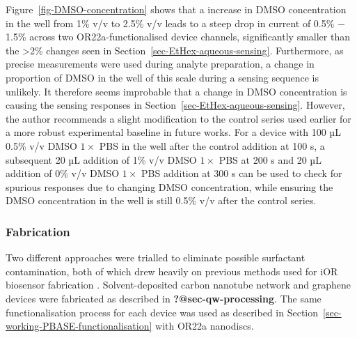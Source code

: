 \documentclass[
  a4paper,
]{scrbook}
\begin{document}
Figure~\ref{fig-DMSO-concentration} shows that a increase in DMSO
concentration in the well from 1\% v/v to 2.5\% v/v leads to a steep
drop in current of 0.5\% \(-\) 1.5\% across two OR22a-functionalised
device channels, significantly smaller than the \textgreater2\% changes
seen in Section~\ref{sec-EtHex-aqueous-sensing}. Furthermore, as precise
measurements were used during analyte preparation, a change in
proportion of DMSO in the well of this scale during a sensing sequence
is unlikely. It therefore seems improbable that a change in DMSO
concentration is causing the sensing responses in
Section~\ref{sec-EtHex-aqueous-sensing}. However, the author recommends
a slight modification to the control series used earlier for a more
robust experimental baseline in future works. For a device with 100 µL
0.5\% v/v DMSO \(1 \times\) PBS in the well after the control addition
at 100 s, a subsequent 20 µL addition of 1\% v/v DMSO \(1 \times\) PBS
at 200 s and 20 µL addition of 0\% v/v DMSO \(1 \times\) PBS addition at
300 s can be used to check for spurious responses due to changing DMSO
concentration, while ensuring the DMSO concentration in the well is
still 0.5\% v/v after the control series.

\hypertarget{fabrication}{%
\subsubsection*{Fabrication}\label{fabrication}}

Two different approaches were trialled to eliminate possible surfactant
contamination, both of which drew heavily on previous methods used for
iOR biosensor fabrication \autocite{Murugathas2019a,Murugathas2020}.
Solvent-deposited carbon nanotube network and graphene devices were
fabricated as described in \textbf{?@sec-qw-processing}. The same
functionalisation process for each device was used as described in
Section~\ref{sec-working-PBASE-functionalisation} with OR22a nanodiscs.
\end{document}

